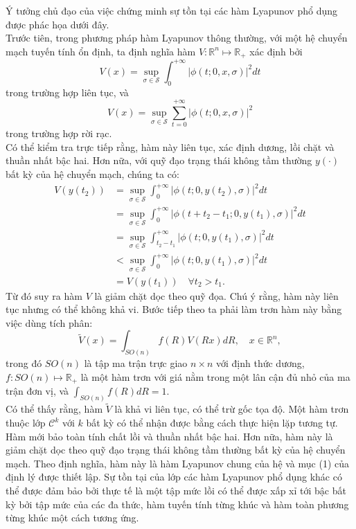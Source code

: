 \documentclass[14pt,a4paper,oneside]{report}		%
\begin{document}
Ý tưởng chủ đạo của việc chứng minh sự tồn tại các hàm Lyapunov phổ dụng được phác họa dưới đây.\\
Trước tiên, trong phương pháp hàm Lyapunov thông thường, với một hệ chuyển mạch tuyến tính ổn định, ta định nghĩa hàm $V:\mathbb{R}^n\mapsto\mathbb{R}_+$ xác định bởi
$$V(x)=\sup_{\sigma\in\mathcal{S}}\int_0^{+\infty}|\phi(t;0,x,\sigma)|^2dt$$
trong trường hợp liên tục, và
$$V(x)=\sup_{\sigma\in\mathcal{S}}\sum_{t=0}^{+\infty}|\phi(t;0,x,\sigma)|^2$$
trong trường hợp rời rạc.\\
Có thể kiểm tra trực tiếp rằng, hàm này liên tục, xác định dương, lồi chặt và thuần nhất bậc hai. Hơn nữa, với quỹ đạo trạng thái không tầm thường $y(\cdot)$ bất kỳ của hệ chuyển mạch, chúng ta có:
\begin{equation}
\begin{split}
V(y(t_2))
&= \sup_{\sigma\in\mathcal{S}}\int^{+\infty}_0|\phi(t;0,y(t_2),\sigma)|^2dt\\
&= \sup_{\sigma\in\mathcal{S}}\int^{+\infty}_0|\phi(t+t_2-t_1;0,y(t_1),\sigma)|^2dt\\
&= \sup_{\sigma\in\mathcal{S}}\int^{+\infty}_{t_2-t_1}|\phi(t;0,y(t_1),\sigma)|^2dt\\
&< \sup_{\sigma\in\mathcal{S}}\int^{+\infty}_0|\phi(t;0,y(t_1),\sigma)|^2dt\\
&= V(y(t_1))\quad\forall t_2>t_1.
\end{split}
\end{equation}
Từ đó suy ra hàm $V$ là giảm chặt dọc theo quỹ đọa. Chú ý rằng, hàm này liên tục nhưng có thể không khả vi. Bước tiếp theo ta phải làm trơn hàm này bằng việc dùng tích phân:
$$\tilde{V}(x)=\int_{SO(n)}f(R)V(Rx)dR,\quad x\in\mathbb{R}^n,$$
trong đó $SO(n)$ là tập ma trận trực giao $n\times n$ với định thức dương, $f:SO(n)\mapsto \mathbb{R}_+$ là một hàm trơn với giá nằm trong một lân cận đủ nhỏ của ma trận đơn vị, và $\int_{SO(n)}f(R)dR=1$.\\
Có thể thấy rằng, hàm $\tilde{V}$ là khả vi liên tục, có thể trừ gốc tọa độ. Một hàm trơn thuộc lớp $\mathcal{C}^k$ với $k$ bất kỳ có thể nhận được bằng cách thực hiện lặp tương tự. Hàm mới bảo toàn tính chất lồi và thuần nhất bậc hai. Hơn nữa, hàm này là giảm chặt dọc theo quỹ đạo trạng thái không tầm thường bất kỳ của hệ chuyển mạch. Theo định nghĩa, hàm này là hàm Lyapunov chung của hệ và mục (1) của định lý được thiết lập. Sự tồn tại của lớp các hàm Lyapunov phổ dụng khác có thể được đảm bảo bởi thực tế là một tập mức lồi có thể được xấp xỉ tới bậc bất kỳ bởi tập mức của các đa thức, hàm tuyến tính từng khúc và hàm toàn phương từng khúc một cách tương ứng.\\
\end{document}
